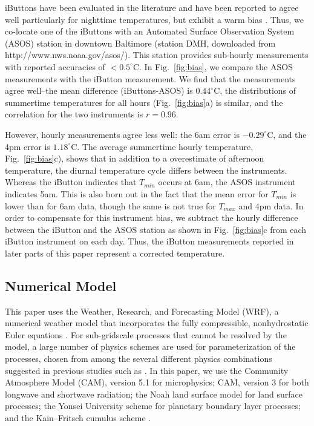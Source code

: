 \documentclass[draft,linenumbers]{agujournal}
\begin{document}
iButtons have been evaluated in the literature and have been reported to agree well particularly for nighttime temperatures, but exhibit a warm bias \citep{scott2017temperature,terando2017ad}. Thus, we co-locate one of the iButtons with an Automated Surface Observation System (ASOS) station in downtown Baltimore (station DMH, downloaded from http://www.nws.noaa.gov/asos/). This station provides sub-hourly measurements with reported accuracies of $< 0.5^\circ $C. In Fig.~\ref{fig:bias}, we compare the ASOS measurements with the iButton measurement. We find that the measurements agree well--the mean difference (iButtons-ASOS) is $0.44^\circ$C, the distributions of summertime temperatures for all hours (Fig.~\ref{fig:bias}a) is similar, and the correlation for the two instruments is $r = 0.96$. 

However, hourly measurements agree less well: the 6am error is $-0.29^\circ$C, and the 4pm error is $1.18^\circ$C. The average summertime hourly temperature, Fig.~\ref{fig:bias}c), shows that in addition to a overestimate of afternoon temperature, the diurnal temperature cycle differs between the instruments. Whereas the iButton indicates that $T_{min}$ occurs at 6am, the ASOS instrument indicates 5am. This is also born out in the fact that the mean error for $T_{min}$ is lower than for 6am data, though the same is not true for $T_{max}$ and 4pm data. In order to compensate for this instrument bias, we subtract the hourly difference between the iButton and the ASOS station as shown in Fig.~\ref{fig:bias}c from each iButton instrument on each day. Thus, the iButton measurements reported in later parts of this paper represent a corrected temperature.  

\subsection{Numerical Model}
This paper uses the Weather, Research, and Forecasting Model (WRF), a numerical weather model that incorporates the fully
compressible, nonhydrostatic Euler equations \cite{skamarock2008description}. %
For sub-gridscale processes that cannot be resolved by the model, a large number of physics schemes are 
used for parameterization of the processes, chosen from among the
several different physics combinations suggested in
previous studies such as \cite{argueso2011evaluation, giannakopoulou2012persian, efstathiou2013sensitivity, zittis2014comparison}. %
In this paper, we use the
Community Atmosphere Model (CAM), version 5.1 \citep{neale2010description} %
for microphysics; CAM, version 3 \citep{collins2004description} %
for both longwave and shortwave radiation;
the Noah land surface model \citep{ek2003implementation} %
for land surface processes; 
the Yonsei University scheme \citep{hong2006new} %
for planetary boundary layer processes;
and the Kain–Fritsch cumulus scheme \citep{kain1990one}. %
\end{document}
